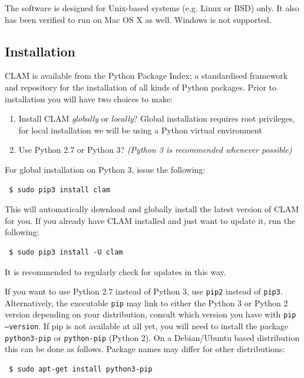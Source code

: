 \documentclass[a4paper,12pt,twoside,openright]{report}
\begin{document}
The software is designed for Unix-based systems (e.g. Linux or BSD) only. It
also has been verified to run on Mac OS X as well. Windows is not supported.

\subsection{Installation}

CLAM is available from the Python Package Index; a standardised framework and
repository for the installation of all kinds of Python packages. Prior to
installation you will have two choices to make:

\begin{enumerate}
    \item Install CLAM \emph{globally} or \emph{locally}? Global installation requires root
        privileges, for local installation we will be using a Python virtual
        environment
    \item Use Python 2.7 or Python 3? \emph{(Python 3 is recommended whenever possible)}
\end{enumerate}

For global installation on Python 3, issue the following:

{ \small
\begin{verbatim} $ sudo pip3 install clam \end{verbatim}
}

This will automatically download and globally install the latest version of
CLAM for you. If you already have CLAM installed and just want to update it,
run the following:

{ \small
\begin{verbatim} $ sudo pip3 install -U clam \end{verbatim}
}

It is recommended to regularly check for updates in this way.

If you want to use Python 2.7 instead of Python 3, use \texttt{pip2} instead of
\texttt{pip3}.  Alternatively, the executable \texttt{pip} may link to either
the Python 3 or Python 2 version depending on your distribution, consult which
version you have with \texttt{pip --version}. If pip is not available at all
yet, you will need to install the package \texttt{python3-pip} or
\texttt{python-pip} (Python 2).  On a Debian/Ubuntu based distribution this can
be done as follows. Package names may differ for other distributions:

{ \small
\begin{verbatim} $ sudo apt-get install python3-pip \end{verbatim}
}
\end{document}
